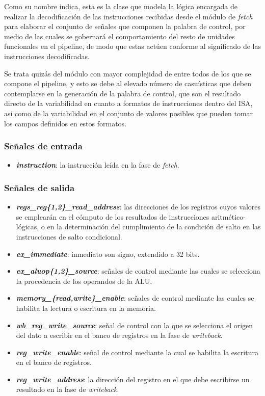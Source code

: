 Como su nombre indica, esta es la clase que modela la lógica encargada de realizar la decodificación de las instrucciones recibidas desde el módulo de \textit{fetch} para elaborar el conjunto de señales que componen la palabra de control, por medio de las cuales se gobernará el comportamiento del resto de unidades funcionales en el pipeline, de modo que estas actúen conforme al significado de las instrucciones decodificadas.

Se trata quizás del módulo con mayor complejidad de entre todos de los que se compone el pipeline, y esto se debe al elevado número de casuísticas que deben contemplarse en la generación de la palabra de control, que son el resultado directo de la variabilidad en cuanto a formatos de instrucciones dentro del ISA, así como de la variabilidad en el conjunto de valores posibles que pueden tomar los campos definidos en estos formatos.

\subsubsection{Señales de entrada}

\begin{itemize}
  \item \textbf{\textit{instruction}}: la instrucción leída en la fase de \textit{fetch}.
\end{itemize}

\subsubsection{Señales de salida}

\begin{itemize}
  \item \textbf{\textit{regs\_reg\{1,2\}\_read\_address}}: las direcciones de los registros cuyos valores se emplearán en el cómputo de los resultados de instrucciones aritmético-lógicas, o en la determinación del cumplimiento de la condición de salto en las instrucciones de salto condicional.
  \vspace{-0.2cm}
  \item \textbf{\textit{ex\_immediate}}: inmediato son signo, extendido a 32 bits.
  \item \textbf{\textit{ex\_aluop\{1,2\}\_source}}: señales de control mediante las cuales se selecciona la procedencia de los operandos de la ALU.
  \item \textbf{\textit{memory\_\{read,write\}\_enable}}: señales de control mediante las cuales se habilita la lectura o escritura en la memoria.
  \item \textbf{\textit{wb\_reg\_write\_source}}: señal de control con la que se selecciona el origen del dato a escribir en el banco de registros en la fase de \textit{writeback}.
  \item \textbf{\textit{reg\_write\_enable}}: señal de control mediante la cual se habilita la escritura en el banco de registros.
  \item \textbf{\textit{reg\_write\_address}}: la dirección del registro en el que debe escribirse un resultado en la fase de \textit{writeback}.
\end{itemize}

